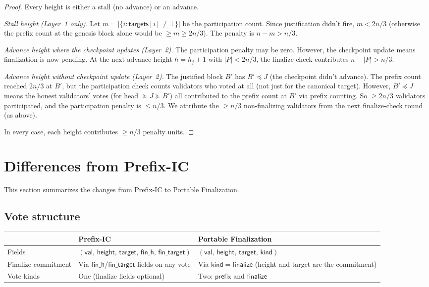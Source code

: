 \ifx\litemode\undefined\documentclass{article}\fi
\newcommand{\target}{\mathsf{target}}
\newcommand{\targets}{\mathsf{targets}}
\newcommand{\kind}{\mathsf{kind}}
\newcommand{\height}{\mathsf{height}}
\newcommand{\finalize}{\mathsf{finalize}}
\newcommand{\prefix}{\mathsf{prefix}}
\newcommand{\fintarget}{\mathsf{fin\_target}}
\newcommand{\val}{\mathsf{val}}
\newcommand{\finh}{\mathsf{fin\_h}}
\theoremstyle{plain}
\theoremstyle{definition}
\theoremstyle{remark}
\begin{document}
\begin{proof}
Every height is either a stall (no advance) or an advance.

\emph{Stall height (Layer~1 only).}
Let $m = |\{i : \targets[i] \neq \bot\}|$ be the participation count.
Since justification didn't fire, $m < 2n/3$ (otherwise the prefix count at the genesis block alone would be $\geq m \geq 2n/3$).
The penalty is $n - m > n/3$.

\emph{Advance height where the checkpoint updates (Layer~2).}
The participation penalty may be zero.
However, the checkpoint update means finalization is now pending.
At the next advance height $h = h_j + 1$ with $|P| < 2n/3$, the finalize check contributes $n - |P| > n/3$.

\emph{Advance height without checkpoint update (Layer~2).}
The justified block $B'$ has $B' \preceq J$ (the checkpoint didn't advance).
The prefix count reached $2n/3$ at $B'$, but the participation check counts validators who voted at all (not just for the canonical target).
However, $B' \preceq J$ means the honest validators' votes (for head $\succeq J \succeq B'$) all contributed to the prefix count at $B'$ via prefix counting.
So $\geq 2n/3$ validators participated, and the participation penalty is $\leq n/3$.
We attribute the $\geq n/3$ non-finalizing validators from the next finalize-check round (as above).

In every case, each height contributes $\geq n/3$ penalty units.
\end{proof}


\appendix
\section{Differences from Prefix-IC}\label{app:diffs-prefixic}

This section summarizes the changes from Prefix-IC to Portable Finalization.

\subsection*{Vote structure}

\begin{center}
\begin{tabularx}{\textwidth}{lXX}
\toprule
& \textbf{Prefix-IC} & \textbf{Portable Finalization} \\
\midrule
Fields & $(\val,\, \height,\, \target,\, \finh,\, \fintarget)$ & $(\val,\, \height,\, \target,\, \kind)$ \\
Finalize commitment & Via $\finh$/$\fintarget$ fields on any vote & Via $\kind = \finalize$ (height and target are the commitment) \\
Vote kinds & One (finalize fields optional) & Two: $\prefix$ and $\finalize$ \\
\bottomrule
\end{tabularx}
\end{center}
\end{document}

